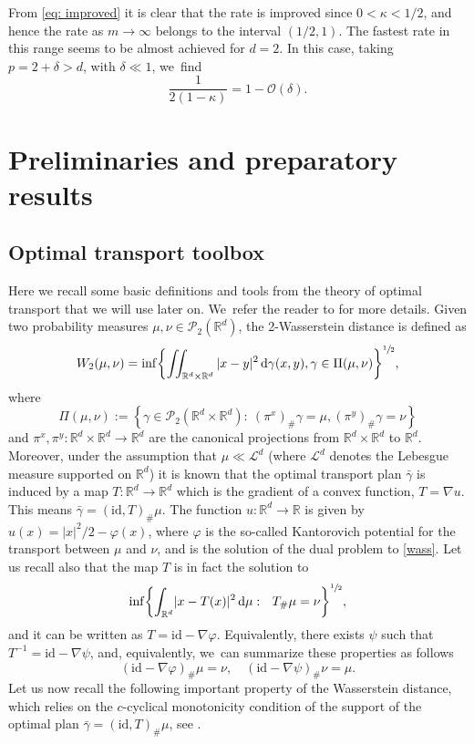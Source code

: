 \documentclass[JEP,XML,SOM,Unicode,published]{cedram}
\newcommand{\curlyL}{\mathcal{L}}
\newcommand{\curlyP}{\mathcal{P}}
\newcommand{\dx}[1]{\mathop{}\!\mathrm{d} #1}
\newcommand{\R}{\mathbb{R}}
\theoremstyle{plain}
\theoremstyle{remark}
\begin{document}
From \eqref{eq: improved} it is clear that the rate is improved since $0<{\kappa}<1/2$, and hence the rate as $m\to\infty$ belongs to the interval $(1/2, 1)$.
The fastest rate in this range seems to be almost achieved for $d=2$. In this case,
taking $p=2+\delta>d$, with $\delta\ll1$, we~find
\begin{equation*}
\frac{1}{2(1-\kappa)}= 1 - \mathcal{O}(\delta).
\end{equation*}

\section{Preliminaries and preparatory results}\label{sec: prelim}

\subsection{Optimal transport toolbox}

Here we recall some basic definitions and tools from the theory of optimal transport that we will use later on. We~refer the reader to \cite{OTAM,villaniOT} for more details.
Given two probability measures $\mu, \nu \in \curlyP_2(\R^d)$, the 2-Wasserstein distance is defined as
\begin{equation}\label{wass}
W_2(\mu, \nu) = \inf \biggl\{\iint_{\R^d\times\R^d} |x-y|^2 \dx \gamma(x,y), \gamma \in \Pi(\mu,\nu)\biggr\}^{\sfrac 12},
\end{equation}
where
\[
\Pi(\mu,\nu):=\left\{\gamma {\in\curlyP_2(\R^d\times\R^d)}:\ (\pi^x)_\#\gamma = \mu, (\pi^y)_\#\gamma = \nu \right\}
\]
and ${\pi^x, \pi^y:\R^d\times\R^d\to\R^d}$ are the canonical projections from $\R^d\times\R^d$ to $\R^d$. Moreover, under the assumption that $\mu\ll \curlyL^d$ (where $\curlyL^d$ denotes the Lebesgue measure {supported} on $\R^d$) it is known that the optimal transport plan $\bar\gamma$ is induced by a map $T:\R^d\to\R^d$ which is the gradient of a convex function, $T=\nabla u$. This means $\bar\gamma= (\mathrm{id}, T)_\#\mu$. The function $u:\R^d \to \R$ is given by $u(x)=|x|^2/2 -\varphi(x)$, where $\varphi$ is the so-called Kantorovich potential for the transport between $\mu$ and $\nu$, and is the solution of the dual problem to \eqref{wass}.
Let us recall also that the map $T$ is in fact the solution to
\begin{equation*}
\inf \biggl\{{\int_{\R^d}} |x-T(x)|^2 \dx \mu:\ \ T_\#\mu = \nu\biggr\}^{\sfrac 12},
\end{equation*}
and it can be written as $T=\mathrm{id} - \nabla \varphi$.
Equivalently, there exists $\psi$ such that $T^{-1}=\mathrm{id}-\nabla \psi$, and, equivalently, we~can summarize these properties as follows
\begin{equation*}
(\mathrm{id} - \nabla \varphi)_\#\mu = \nu, \quad (\mathrm{id} - \nabla \psi)_\#\nu = \mu.
\end{equation*}
Let us now recall the following important property of the Wasserstein distance, which relies on the $c$-cyclical monotonicity condition {of the support of the optimal plan $\bar\gamma = (\mathrm{id}, T)_\#\mu$}, see \cite{BJR2007}.
\end{document}
